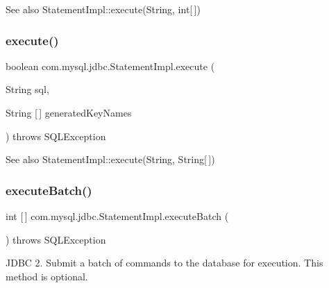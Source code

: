 \begin{DoxySeeAlso}{See also}
Statement\+Impl\+::execute(\+String, int\mbox{[}$\,$\mbox{]}) 
\end{DoxySeeAlso}
\mbox{\label{classcom_1_1mysql_1_1jdbc_1_1_statement_impl_a75e802cf3fe18780f15b9ddd23795e7f}} 
\subsubsection{\texorpdfstring{execute()}{execute()}\hspace{0.1cm}{\footnotesize\ttfamily [4/4]}}
{\footnotesize\ttfamily boolean com.\+mysql.\+jdbc.\+Statement\+Impl.\+execute (\begin{DoxyParamCaption}\item[{String}]{sql,  }\item[{String \mbox{[}$\,$\mbox{]}}]{generated\+Key\+Names }\end{DoxyParamCaption}) throws S\+Q\+L\+Exception}

\begin{DoxySeeAlso}{See also}
Statement\+Impl\+::execute(\+String, String\mbox{[}$\,$\mbox{]}) 
\end{DoxySeeAlso}
\mbox{\label{classcom_1_1mysql_1_1jdbc_1_1_statement_impl_acf49c07c2b02c99e25719bb916bc0b39}} 
\subsubsection{\texorpdfstring{execute\+Batch()}{executeBatch()}}
{\footnotesize\ttfamily int \mbox{[}$\,$\mbox{]} com.\+mysql.\+jdbc.\+Statement\+Impl.\+execute\+Batch (\begin{DoxyParamCaption}{ }\end{DoxyParamCaption}) throws S\+Q\+L\+Exception}

J\+D\+BC 2. Submit a batch of commands to the database for execution. This method is optional.

